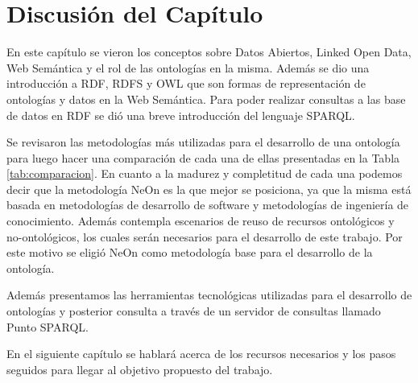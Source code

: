 \section{Discusión del Capítulo}
En este capítulo se vieron los conceptos sobre Datos Abiertos, Linked Open Data, Web Semántica y el rol de las ontologías en la misma. Además se dio una introducción a RDF, RDFS y OWL que son formas de representación de ontologías y datos en la Web Semántica. Para poder realizar consultas a las base de datos en RDF se dió una breve introducción del lenguaje SPARQL.

Se revisaron las metodologías más utilizadas para el desarrollo de una ontología para luego hacer una comparación de cada una de ellas presentadas en la Tabla \ref{tab:comparacion}. En cuanto a la madurez y completitud de cada una podemos decir que la metodología NeOn es la que mejor se posiciona, ya que la misma está basada en metodologías de desarrollo de software y metodologías de ingeniería de conocimiento. Además contempla escenarios de reuso de recursos ontológicos y no-ontológicos, los cuales serán necesarios para el desarrollo de este trabajo. Por este motivo se eligió NeOn como metodología base para el desarrollo de la ontología.

Además presentamos las herramientas tecnológicas utilizadas para el desarrollo de ontologías y posterior consulta a través de un servidor de consultas llamado Punto SPARQL.

En el siguiente capítulo se hablará acerca de los recursos necesarios y los pasos seguidos para llegar al objetivo propuesto del trabajo.
